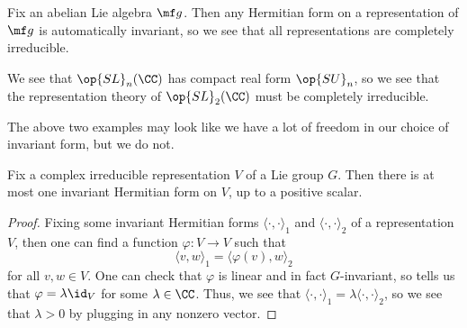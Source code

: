\documentclass[../notes.tex]{subfiles}
\begin{document}
\begin{example}
	Fix an abelian Lie algebra $\mf g$. Then any Hermitian form on a representation of $\mf g$ is automatically invariant, so we see that all representations are completely irreducible.
\end{example}
\begin{example}
	We see that $\op{SL}_n(\CC)$ has compact real form $\op{SU}_n$, so we see that the representation theory of $\op{SL}_2(\CC)$ must be completely irreducible.\todo{}
\end{example}
The above two examples may look like we have a lot of freedom in our choice of invariant form, but we do not.
\begin{proposition}
	Fix a complex irreducible representation $V$ of a Lie group $G$. Then there is at most one invariant Hermitian form on $V$, up to a positive scalar.
\end{proposition}
\begin{proof}
	Fixing some invariant Hermitian forms $\langle\cdot,\cdot\rangle_1$ and $\langle\cdot,\cdot\rangle_2$ of a representation $V$, then one can find a function $\varphi\colon V\to V$ such that
	\[\langle v,w\rangle_1=\langle \varphi(v),w\rangle_2\]
	for all $v,w\in V$. One can check that $\varphi$ is linear and in fact $G$-invariant, so  tells us that $\varphi=\lambda\id_V$ for some $\lambda\in\CC$. Thus, we see that $\langle\cdot,\cdot\rangle_1=\lambda\langle\cdot,\cdot\rangle_2$, so we see that $\lambda>0$ by plugging in any nonzero vector.
\end{proof}
\end{document}
